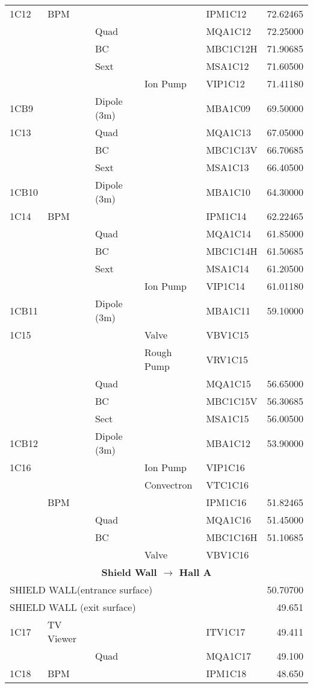 \begin{longtable}[hpt]{lllllr}
1C12 & BPM &&& IPM1C12 & 72.62465 \\
&& Quad && MQA1C12 & 72.25000 \\
&& BC && MBC1C12H & 71.90685 \\
&& Sext && MSA1C12 & 71.60500 \\
&&& Ion Pump & VIP1C12 & 71.41180 \\
1CB9 && Dipole (3m) && MBA1C09 & 69.50000 \\
1C13 && Quad && MQA1C13 & 67.05000 \\
&& BC && MBC1C13V & 66.70685 \\
&& Sext && MSA1C13 & 66.40500 \\
1CB10 && Dipole (3m) && MBA1C10 & 64.30000 \\
1C14 & BPM &&& IPM1C14 & 62.22465 \\
&& Quad && MQA1C14 & 61.85000 \\
&& BC && MBC1C14H & 61.50685 \\
&& Sext && MSA1C14 & 61.20500 \\
&&& Ion Pump & VIP1C14 & 61.01180 \\
1CB11 && Dipole (3m) && MBA1C11 & 59.10000 \\
1C15 &&& Valve & VBV1C15 & \\
&&& Rough Pump & VRV1C15 & \\
&& Quad && MQA1C15 & 56.65000 \\
&& BC && MBC1C15V & 56.30685 \\
&& Sect && MSA1C15 & 56.00500 \\
1CB12 && Dipole (3m) && MBA1C12 & 53.90000 \\ 
1C16 &&& Ion Pump & VIP1C16 & \\
&&& Convectron & VTC1C16 & \\
& BPM &&& IPM1C16 & 51.82465 \\
&& Quad && MQA1C16 & 51.45000 \\
&& BC && MBC1C16H & 51.10685 \\
&&& Valve & VBV1C16 & \\ 
\hline \multicolumn{6}{c}{{\bf Shield Wall $\rightarrow$ Hall A}} \\ \hline 
\multicolumn{5}{l}{SHIELD WALL(entrance surface)} & 50.70700 \\
\multicolumn{5}{l}{SHIELD WALL (exit surface)} &  49.651 \\
\hline
1C17 & TV Viewer &&& ITV1C17 & 49.411 \\
&& Quad && MQA1C17 & 49.100 \\
1C18 & BPM &&& IPM1C18 & 48.650 \\

\end{longtable}
